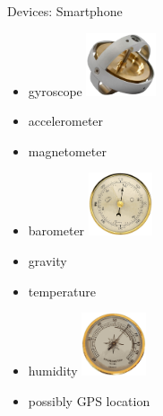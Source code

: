 \documentclass[aspectratio=1610]{beamer}
\begin{document}
  \begin{frame}{Devices: Smartphone}
    \begin{itemize}
      \item gyroscope
            \hspace*{2em}
            \includegraphics[align=c,height=5em]{gyroscope}
      \item accelerometer
      \item magnetometer
      \item barometer
            \hspace*{2em}
            \includegraphics[align=c,height=5em]{barometer}
      \item gravity
      \item temperature
      \item humidity
            \hspace*{2em}
            \includegraphics[align=c,height=5em]{hygrometer}
      \item possibly GPS location
    \end{itemize}
  \end{frame}
\end{document}
